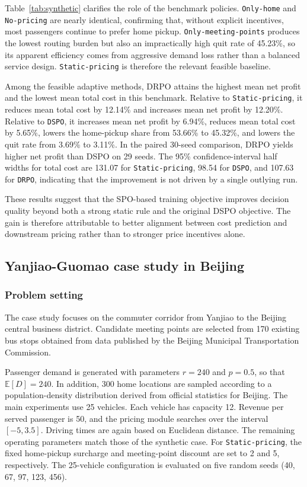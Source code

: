 \documentclass[preprint,12pt,authoryear]{elsarticle}
\begin{document}
Table~\ref{tab:synthetic} clarifies the role of the benchmark policies. \texttt{Only-home} and \texttt{No-pricing} are nearly identical, confirming that, without explicit incentives, most passengers continue to prefer home pickup. \texttt{Only-meeting-points} produces the lowest routing burden but also an impractically high quit rate of 45.23\%, so its apparent efficiency comes from aggressive demand loss rather than a balanced service design. \texttt{Static-pricing} is therefore the relevant feasible baseline.

Among the feasible adaptive methods, DRPO attains the highest mean net profit and the lowest mean total cost in this benchmark. Relative to \texttt{Static-pricing}, it reduces mean total cost by 12.14\% and increases mean net profit by 12.20\%. Relative to \texttt{DSPO}, it increases mean net profit by 6.94\%, reduces mean total cost by 5.65\%, lowers the home-pickup share from 53.66\% to 45.32\%, and lowers the quit rate from 3.69\% to 3.11\%. In the paired 30-seed comparison, DRPO yields higher net profit than DSPO on 29 seeds. The 95\% confidence-interval half widths for total cost are 131.07 for \texttt{Static-pricing}, 98.54 for \texttt{DSPO}, and 107.63 for \texttt{DRPO}, indicating that the improvement is not driven by a single outlying run.

These results suggest that the SPO-based training objective improves decision quality beyond both a strong static rule and the original DSPO objective. The gain is therefore attributable to better alignment between cost prediction and downstream pricing rather than to stronger price incentives alone.

\subsection{Yanjiao-Guomao case study in Beijing}

\subsubsection{Problem setting}

The case study focuses on the commuter corridor from Yanjiao to the Beijing central business district. Candidate meeting points are selected from 170 existing bus stops obtained from data published by the Beijing Municipal Transportation Commission.

Passenger demand is generated with parameters $r=240$ and $p=0.5$, so that $\mathbb{E}[D]=240$. In addition, 300 home locations are sampled according to a population-density distribution derived from official statistics for Beijing. The main experiments use 25 vehicles. Each vehicle has capacity 12. Revenue per served passenger is 50, and the pricing module searches over the interval $[-5,3.5]$. Driving times are again based on Euclidean distance. The remaining operating parameters match those of the synthetic case. For \texttt{Static-pricing}, the fixed home-pickup surcharge and meeting-point discount are set to 2 and 5, respectively. The 25-vehicle configuration is evaluated on five random seeds (40, 67, 97, 123, 456).
\end{document}
